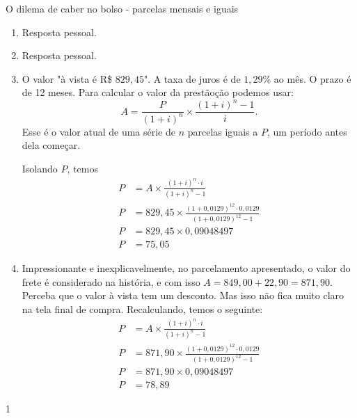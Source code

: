 \marginpar{\vspace{-1em}}
\begin{answer}{O dilema de caber no bolso - parcelas mensais e iguais}
{
\begin{enumerate}
\item Resposta pessoal.
\item Resposta pessoal.
\item O valor "à vista é R\$ $829{,}45$". A taxa de juros é de $1{,}29\%$ ao mês. O prazo é de 12 meses. Para calcular o valor da prestãoção podemos usar:
\begin{equation*}
A=\frac{P}{(1+i)^n}\times\frac{(1+i)^n-1}{i}.
\end{equation*}
Esse é o valor atual de uma série de $n$ parcelas iguais a $P$, um período antes dela começar.

Isolando $P$, temos
\begin{align*}
P&=A\times\frac{(1+i)^n\cdot i}{(1+i)^n-1} \\
P&=829{,}45\times\frac{(1+0{,}0129)^12\cdot0{,}0129}{(1+0{,}0129)^12-1}\\
P&=829{,}45\times0{,}09048497\\
P&=75{,}05
\end{align*}

\item Impressionante e inexplicavelmente, no parcelamento apresentado, o valor do frete é considerado na história, e com isso $A=849{,}00+22{,}90=871{,}90$. Perceba que o valor à vista tem um desconto. Mas isso não fica muito claro na tela final de compra. Recalculando, temos o seguinte:
\begin{align*}
P&=A\times\frac{(1+i)^n\cdot i}{(1+i)^n-1} \\
P&=871{,}90\times\frac{(1+0{,}0129)^12\cdot0{,}0129}{(1+0{,}0129)^12-1}\\
P&=871{,}90\times0{,}09048497\\
P&=78{,}89
\end{align*}

\end{enumerate}
}{1}
\end{answer}
